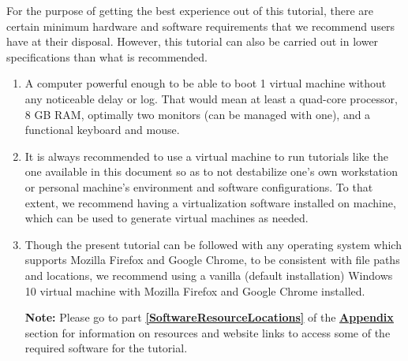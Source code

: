\documentclass[12pt]{extarticle}
\newcommand{\ben}{\begin{enumerate}}
\newcommand{\een}{\end{enumerate}}
\begin{document}
	\vspace{4mm}
	\noindent
	For the purpose of getting the best experience out of this tutorial, there are certain minimum hardware and software requirements that we recommend users have at their disposal. However, this tutorial can also be carried out in lower specifications than what is recommended.
	
	\ben
	
	\item A computer powerful enough to be able to boot 1 virtual machine without any noticeable delay or log. That would mean at least a quad-core processor, 8 GB RAM, optimally two monitors (can be managed with one), and a functional keyboard and mouse.
	
	\item It is always recommended to use a virtual machine to run tutorials like the one available in this document so as to not destabilize one's own workstation or personal machine's environment and software configurations. To that extent, we recommend having a virtualization software installed on machine, which can be used to generate virtual machines as needed. 
	
	\item Though the present tutorial can be followed with any operating system which supports Mozilla Firefox and Google Chrome, to be consistent with file paths and locations, we recommend using a vanilla (default installation) Windows 10 virtual machine with Mozilla Firefox and Google Chrome installed. 
	
	\textbf{Note:} Please go to part \textbf{\underline{\ref{SoftwareResourceLocations}}} of the {\textbf{\hyperref[slide 22]{\underline{Appendix}}}} section for information on resources and website links to access some of the required software for the tutorial.
	
	\een



\end{document}
